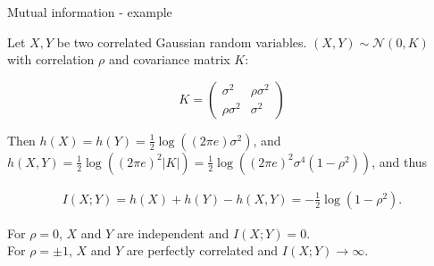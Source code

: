 \documentclass[11pt,compress,t,notes=noshow, xcolor=table]{beamer}
\begin{document}
\begin{vbframe} {Mutual information - example}

Let $X, Y$ be two correlated Gaussian random variables. $(X, Y) \sim \mathcal{N}(0, K)$ with correlation $\rho$ and covariance matrix $K$:

$$
K =
\begin{pmatrix}
  \sigma^2 & \rho \sigma^2 \\
  \rho \sigma^2 & \sigma^2
\end{pmatrix}
$$

Then $h(X) = h(Y) = \frac{1}{2} \log\left((2 \pi e) \sigma^2\right)$, and $h(X,Y) = \frac{1}{2}\log\left((2 \pi e)^2 \vert K\vert\right) = \frac{1}{2}\log\left((2 \pi e)^2 \sigma^4 (1 - \rho^2)\right)$, and thus

\begin{equation*}
\begin{aligned}
I(X;Y) = h(X) + h(Y) - h(X,Y) = -  \frac{1}{2} \log(1 - \rho^2).
\end{aligned}
\end{equation*}

For $\rho = 0$, $X$ and $Y$ are independent and $I(X;Y) = 0$. \\
For $\rho = \pm 1$, $X$ and $Y$ are perfectly correlated and $I(X;Y) \rightarrow \infty$. 
\end{vbframe}






\end{document}
